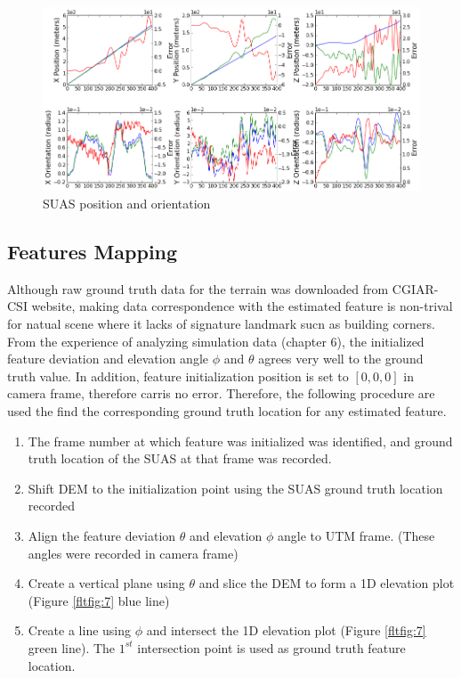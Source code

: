 \begin{figure}[h]
\centering
\includegraphics[width=12cm, keepaspectratio=true]
{./Figures/fltfig/cut1/Figure30.png}
\caption{SUAS position and orientation}
\label{fltfig:6}
\end{figure}

\subsection{Features Mapping}

Although raw ground truth data for the terrain was downloaded from
\cite{_cgiar-csi_????} CGIAR-CSI website, making data correspondence
with the estimated feature is non-trival for natual scene where it
lacks of signature landmark sucn as building corners. From the
experience of analyzing simulation data (chapter 6), the initialized
feature deviation and elevation angle $\phi$ and $\theta$ agrees very
well to the ground truth value. In addition, feature initialization
position is set to $[0, 0, 0]$ in camera frame, therefore carris no
error. Therefore, the following procedure are used the find the
corresponding ground truth location for any estimated feature. 

\begin{enumerate}
  \item The frame number at which feature was initialized was
  identified, and ground truth location of the SUAS at that frame was
  recorded.
  \item Shift DEM to the initialization point using the SUAS ground
  truth location recorded
  \item Align the feature deviation $\theta$ and elevation $\phi$ angle to UTM frame.
  (These angles were recorded in camera frame)
  \item Create a vertical plane using $\theta$ and slice the DEM to
  form a 1D elevation plot (Figure \ref{fltfig:7} blue line)
  \item Create a line using $\phi$ and intersect the 1D elevation plot
  (Figure \ref{fltfig:7} green line). The $1^{st}$ intersection point
  is used as ground truth feature location.
\end{enumerate}

